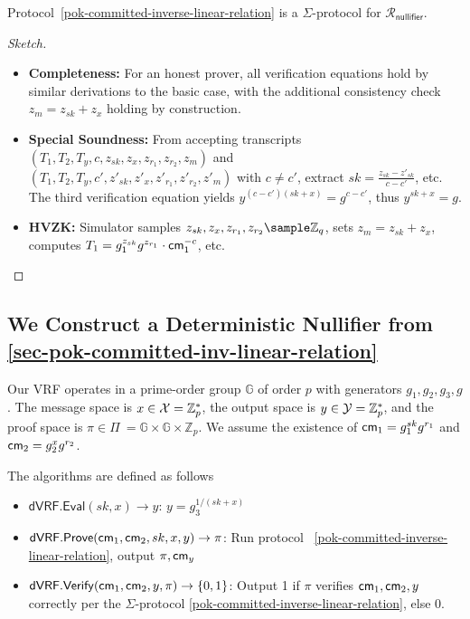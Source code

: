 \begin{theorem}
Protocol~\ref{pok-committed-inverse-linear-relation} is a $\Sigma$-protocol for $\mathcal{R}_{\mathsf{nullifier}}$.
\end{theorem}

\begin{proof}[Sketch]
\begin{itemize}
    \item \textbf{Completeness:} For an honest prover, all verification equations hold by similar derivations to the basic case, with the additional consistency check $z_m = z_{sk} + z_x$ holding by construction.
    
    \item \textbf{Special Soundness:} From accepting transcripts $(T_1, T_2, T_y, c, z_{sk}, z_x, z_{r_1}, z_{r_2}, z_m)$ and \\ $(T_1, T_2, T_y, c', z'_{sk}, z'_x, z'_{r_1}, z'_{r_2}, z'_m)$ with $c \neq c'$, extract $sk = \frac{z_{sk} - z'_{sk}}{c - c'}$, etc. The third verification equation yields $y^{(c - c')(sk + x)} = g^{c - c'}$, thus $y^{sk+x} = g$.

    \item \textbf{HVZK:} Simulator samples $z_{sk}, z_x, z_{r_1}, z_{r_2} \sample \mathbb{Z}_q$, sets $z_m = z_{sk} + z_x$, computes $T_1 = g_1^{z_{sk}}g^{z_{r_1}} \cdot \mathsf{cm}_1^{-c}$, etc.
\end{itemize}
\end{proof}








\subsection{We Construct a Deterministic Nullifier from \ref{sec-pok-committed-inv-linear-relation}}
\label{subsec:deterministic-nullifier}

Our VRF operates in a prime-order group $\mathbb{G}$ of order $p$ with generators $g_1, g_2, g_3, g$. The message space is $ x \in \mathcal{X} = \mathbb{Z}_p^*$, the output space is $y \in \mathcal{Y} = \mathbb{Z}_p^*$, and the proof space is $\pi \in \Pi\ = \mathbb{G} \times \mathbb{G} \times \mathbb{Z}_p$. We assume the existence of $\mathsf{cm}_1 = g_1^{sk} g^{r_1}$ and $\mathsf{cm}_2 = g_2^{x} g^{r_2}$.

The algorithms are defined as follows

\begin{itemize}
    \item $\mathsf{dVRF.Eval}(sk, x) \to y$: $y = g_3^{1/(sk+x)}$
    
    \item $\mathsf{dVRF.Prove}(\mathsf{cm}_1, \mathsf{cm}_2, sk, x, y) \to \pi$: Run protocol ~\ref{pok-committed-inverse-linear-relation}, output $\pi, \mathsf{cm}_y$
    
    \item $\mathsf{dVRF.Verify}(\mathsf{cm}_1, \mathsf{cm}_2, y, \pi) \to \{0,1\}$: Output 1 if $\pi$ verifies $\mathsf{cm}_1, \mathsf{cm}_2, y$ correctly per the $\Sigma$-protocol \ref{pok-committed-inverse-linear-relation}, else 0.
\end{itemize}



